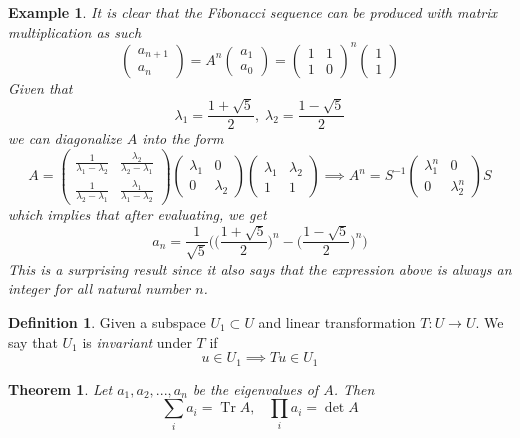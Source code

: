 \documentclass{article}
\DeclareMathOperator{\Tr}{Tr}
\newtheorem{theorem}{Theorem}[section]
\newtheorem{example}{Example}[section]
\theoremstyle{remark}
\theoremstyle{definition}
\newtheorem{definition}{Definition}[section]
\begin{document}
\begin{example}
It is clear that the Fibonacci sequence can be produced with matrix multiplication as such 
\[ \begin{pmatrix}
a_{n+1} \\ a_n
\end{pmatrix} = A^n \begin{pmatrix}
a_1 \\ a_0
\end{pmatrix} = \begin{pmatrix}
1&1\\1&0
\end{pmatrix}^n \begin{pmatrix}
1\\1
\end{pmatrix}\]
Given that 
\[\lambda_1 = \frac{1+\sqrt{5}}{2}, \; \lambda_2 = \frac{1 - \sqrt{5}}{2}\]
we can diagonalize $A$ into the form 
\[A = \begin{pmatrix}
\frac{1}{\lambda_1 - \lambda_2} & \frac{\lambda_2}{\lambda_2 - \lambda_1} \\
\frac{1}{\lambda_2 - \lambda_1} & \frac{\lambda_1}{\lambda_1 - \lambda_2}
\end{pmatrix} \begin{pmatrix}
\lambda_1 & 0 \\ 0 & \lambda_2 
\end{pmatrix} \begin{pmatrix}
\lambda_1 & \lambda_2 \\
1 & 1
\end{pmatrix} \implies A^n = S^{-1} \begin{pmatrix}
\lambda_1^n & 0 \\ 0 & \lambda_2^n 
\end{pmatrix} S\]
which implies that after evaluating, we get 
\[ a_n = \frac{1}{\sqrt{5}} \bigg( \Big(\frac{1+\sqrt{5}}{2}\Big)^n - \Big(\frac{1-\sqrt{5}}{2}\Big)^n \bigg)\]
This is a surprising result since it also says that the expression above is always an integer for all natural number $n$. 
\end{example}
\begin{definition}
Given a subspace $U_1 \subset U$ and linear transformation $T: U \longrightarrow U$. We say that $U_1$ is \textit{invariant} under $T$ if 
\[u \in U_1 \implies T u \in U_1\]
\end{definition}

\begin{theorem} 
Let $a_1, a_2, ..., a_n$ be the eigenvalues of $A$. Then 
\[\sum_i a_i = \Tr{A}, \;\;\; \prod_i a_i = \det{A}\]
\end{theorem}
\end{document}
